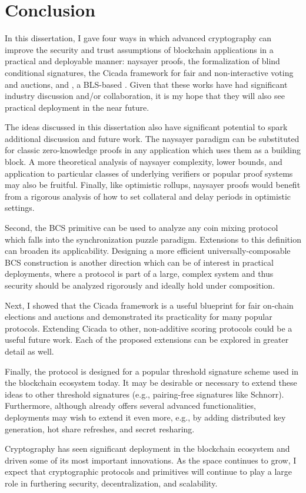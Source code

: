 \chapter{Conclusion}\label{sec:conclusion}

In this dissertation, I gave four ways in which advanced cryptography can improve the security and trust assumptions of blockchain applications in a practical and deployable manner: naysayer proofs, the formalization of blind conditional signatures, the Cicada framework for fair and non-interactive voting and auctions, and \sysname, a BLS-based \hcwl. Given that these works have had significant industry discussion and/or collaboration, it is my hope that they will also see practical deployment in the near future. 

The ideas discussed in this dissertation also have significant potential to spark additional discussion and future work. The naysayer paradigm can be substituted for classic zero-knowledge proofs in any application which uses them as a building block. A more theoretical analysis of naysayer complexity, lower bounds, and application to particular classes of underlying verifiers or popular proof systems may also be fruitful. Finally, like optimistic rollups, naysayer proofs would benefit from a rigorous analysis of how to set collateral and delay periods in optimistic settings.

Second, the BCS primitive can be used to analyze any coin mixing protocol which falls into the synchronization puzzle paradigm. Extensions to this definition can broaden its applicability. Designing a more efficient universally-composable BCS construction is another direction which can be of interest in practical deployments, where a protocol is part of a large, complex system and thus security should be analyzed rigorously and ideally hold under composition.

Next, I showed that the Cicada framework is a useful blueprint for fair on-chain elections and auctions and demonstrated its practicality for many popular protocols. Extending Cicada to other, non-additive scoring protocols could be a useful future work. Each of the proposed extensions can be explored in greater detail as well.

Finally, the \hcwl protocol \sysname is designed for a popular threshold signature scheme
used in the blockchain ecosystem today. It may be desirable or necessary to extend these ideas to other threshold signatures (e.g., pairing-free signatures like Schnorr). Furthermore, although \sysname already offers several advanced functionalities, deployments may wish to extend it even more, e.g., by adding distributed key generation, hot share refreshes, and secret resharing.

Cryptography has seen significant deployment in the blockchain ecosystem and driven some of its most important innovations. As the space continues to grow, I expect that cryptographic protocols and primitives will continue to play a large role in furthering security, decentralization, and scalability.